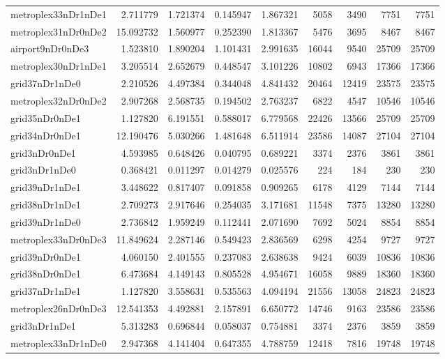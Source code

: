 \begin{longtable}{|l|r|r|r|r|r|r|r|r|}
metroplex33nDr1nDe1 & 2.711779 & 1.721374 & 0.145947 & 1.867321 & 5058 & 3490 & 7751 & 7751 \\
metroplex31nDr0nDe2 & 15.092732 & 1.560977 & 0.252390 & 1.813367 & 5476 & 3695 & 8467 & 8467 \\
airport9nDr0nDe3 & 1.523810 & 1.890204 & 1.101431 & 2.991635 & 16044 & 9540 & 25709 & 25709 \\
metroplex30nDr1nDe1 & 3.205514 & 2.652679 & 0.448547 & 3.101226 & 10802 & 6943 & 17366 & 17366 \\
grid37nDr1nDe0 & 2.210526 & 4.497384 & 0.344048 & 4.841432 & 20464 & 12419 & 23575 & 23575 \\
metroplex32nDr0nDe2 & 2.907268 & 2.568735 & 0.194502 & 2.763237 & 6822 & 4547 & 10546 & 10546 \\
grid35nDr0nDe1 & 1.127820 & 6.191551 & 0.588017 & 6.779568 & 22426 & 13566 & 25709 & 25709 \\
grid34nDr0nDe1 & 12.190476 & 5.030266 & 1.481648 & 6.511914 & 23586 & 14087 & 27104 & 27104 \\
grid3nDr0nDe1 & 4.593985 & 0.648426 & 0.040795 & 0.689221 & 3374 & 2376 & 3861 & 3861 \\
grid3nDr1nDe0 & 0.368421 & 0.011297 & 0.014279 & 0.025576 & 224 & 184 & 230 & 230 \\
grid39nDr1nDe1 & 3.448622 & 0.817407 & 0.091858 & 0.909265 & 6178 & 4129 & 7144 & 7144 \\
grid38nDr1nDe1 & 2.709273 & 2.917646 & 0.254035 & 3.171681 & 11548 & 7375 & 13280 & 13280 \\
grid39nDr1nDe0 & 2.736842 & 1.959249 & 0.112441 & 2.071690 & 7692 & 5024 & 8854 & 8854 \\
metroplex33nDr0nDe3 & 11.849624 & 2.287146 & 0.549423 & 2.836569 & 6298 & 4254 & 9727 & 9727 \\
grid39nDr0nDe1 & 4.060150 & 2.401555 & 0.237083 & 2.638638 & 9424 & 6039 & 10836 & 10836 \\
grid38nDr0nDe1 & 6.473684 & 4.149143 & 0.805528 & 4.954671 & 16058 & 9889 & 18360 & 18360 \\
grid37nDr1nDe1 & 1.127820 & 3.558631 & 0.535563 & 4.094194 & 21556 & 13058 & 24823 & 24823 \\
metroplex26nDr0nDe3 & 12.541353 & 4.492881 & 2.157891 & 6.650772 & 14746 & 9163 & 23586 & 23586 \\
grid3nDr1nDe1 & 5.313283 & 0.696844 & 0.058037 & 0.754881 & 3374 & 2376 & 3859 & 3859 \\
metroplex33nDr1nDe0 & 2.947368 & 4.141404 & 0.647355 & 4.788759 & 12418 & 7816 & 19748 & 19748 \\

\end{longtable}
